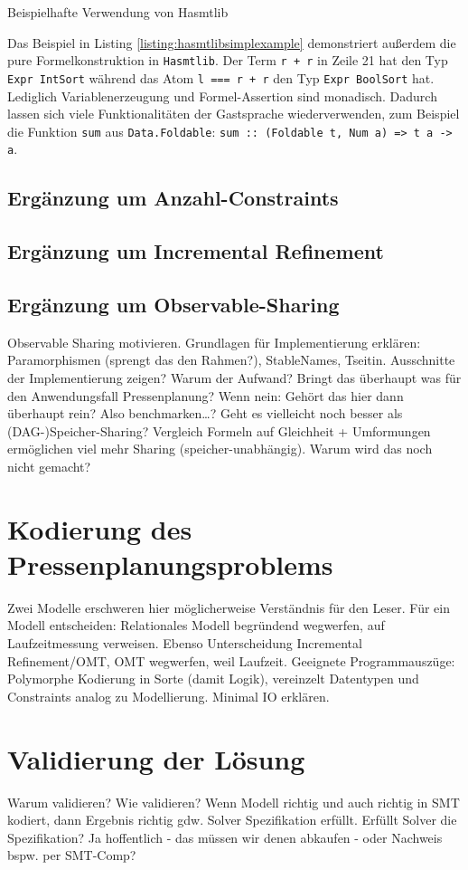 \begin{listing}[H]
    \inputminted[linenos=true]{haskell}{Code/Implementierung/Hasmtlib/BeispielSimple.hs}
    \caption{Beispielhafte Verwendung von Hasmtlib}
    \label{listing:hasmtlibsimplexample}
\end{listing}

Das Beispiel in Listing \ref{listing:hasmtlibsimplexample} demonstriert außerdem die pure Formelkonstruktion in \texttt{Hasmtlib}.
Der Term \texttt{r + r} in Zeile 21 hat den Typ \texttt{Expr IntSort} während das Atom \texttt{l === r + r} den Typ \texttt{Expr BoolSort} hat.
Lediglich Variablenerzeugung und Formel-Assertion sind monadisch.
Dadurch lassen sich viele Funktionalitäten der Gastsprache wiederverwenden, zum Beispiel die Funktion \texttt{sum} aus \texttt{Data.Foldable}:
\texttt{sum :: (Foldable t, Num a) => t a -> a}.

\subsection{Ergänzung um Anzahl-Constraints}

\subsection{Ergänzung um Incremental Refinement}

\subsection{Ergänzung um Observable-Sharing}
Observable Sharing motivieren.
Grundlagen für Implementierung erklären: Paramorphismen (sprengt das den Rahmen?), StableNames, Tseitin.
Ausschnitte der Implementierung zeigen?
Warum der Aufwand?
Bringt das überhaupt was für den Anwendungsfall Pressenplanung?
Wenn nein: Gehört das hier dann überhaupt rein?
Also benchmarken\ldots?
Geht es vielleicht noch besser als (DAG-)Speicher-Sharing?
Vergleich Formeln auf Gleichheit + Umformungen ermöglichen viel mehr Sharing (speicher-unabhängig).
Warum wird das noch nicht gemacht?

\section{Kodierung des Pressenplanungsproblems}
Zwei Modelle erschweren hier möglicherweise Verständnis für den Leser.
Für ein Modell entscheiden: Relationales Modell begründend wegwerfen, auf Laufzeitmessung verweisen.
Ebenso Unterscheidung Incremental Refinement/OMT, OMT wegwerfen, weil Laufzeit.
Geeignete Programmauszüge: Polymorphe Kodierung in Sorte (damit Logik), vereinzelt Datentypen und Constraints analog zu Modellierung.
Minimal IO erklären.

\section{Validierung der Lösung}
Warum validieren?
Wie validieren?
Wenn Modell richtig und auch richtig in SMT kodiert, dann Ergebnis richtig gdw. Solver Spezifikation erfüllt.
Erfüllt Solver die Spezifikation? Ja hoffentlich - das müssen wir denen abkaufen - oder Nachweis bspw. per SMT-Comp?